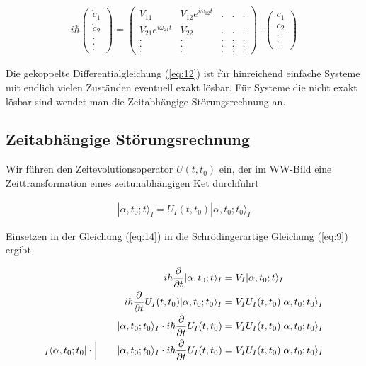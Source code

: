 \begin{align}
  \label{eq:13}
  i\hbar \begin{pmatrix}\dot c_1\\\dot c_2\\.\\.\\.\end{pmatrix} =
\begin{pmatrix}
V_{11}&V_{12}e^{i\omega_{12}t}&.&.&.\\
V_{21}e^{i\omega_{21}t}&V_{22}&.&.&.\\
  .&.&.&.&.\\
  .&.&.&.&.\\
  .&.&.&.&.
\end{pmatrix}\cdot\begin{pmatrix}c_1\\c_2\\.\\.\\.\end{pmatrix}
\end{align}

Die gekoppelte Differentialgleichung (\ref{eq:12}) ist für hinreichend einfache Systeme mit endlich vielen Zuständen eventuell exakt lösbar. Für Systeme die nicht exakt lösbar sind wendet man die Zeitabhängige Störungsrechnung an.

\subsection*{Zeitabhängige Störungsrechnung}

Wir führen den Zeitevolutionsoperator \(U(t,t_0)\) ein, der im WW-Bild eine Zeittransformation eines zeitunabhängigen Ket durchführt

\begin{align}
  \label{eq:14}
  |\alpha,t_0;t\rangle_I = U_I(t,t_0)|\alpha,t_0;t_0\rangle_I
\end{align}

Einsetzen in der Gleichung (\ref{eq:14}) in die Schrödingerartige Gleichung (\ref{eq:9}) ergibt

\begin{align}
  \label{eq:15}
   i\hbar \frac{\partial}{\partial t}|\alpha,t_0;t\rangle_I  &= V_I|\alpha,t_0;t\rangle_I \notag\\
 i\hbar \frac{\partial}{\partial t}  U_I(t,t_0)|\alpha,t_0;t_0\rangle_I &= V_I U_I(t,t_0)|\alpha,t_0;t_0\rangle_I  \notag\\
|\alpha,t_0;t_0\rangle_I \cdot i\hbar \frac{\partial}{\partial t}  U_I(t,t_0) &= V_I U_I(t,t_0)|\alpha,t_0;t_0\rangle_I \notag\\
 _I\langle \alpha,t_0;t_0| \cdot\Big|\qquad |\alpha,t_0;t_0\rangle_I \cdot i\hbar \frac{\partial}{\partial t}  U_I(t,t_0) &= V_I U_I(t,t_0)|\alpha,t_0;t_0\rangle_I
\end{align}

